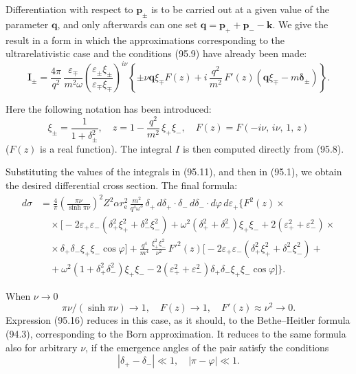 Differentiation with respect to $\mathbf{p}_\pm$ is to be carried out at a given value of the parameter $\mathbf{q}$, and only afterwards can one set $\mathbf{q} = \mathbf{p}_+ + \mathbf{p}_- - \mathbf{k}$. We give the result in a form in which the approximations corresponding to the ultrarelativistic case and the conditions (95.9) have already been made:
\begin{equation}
\mathbf{I}_\pm = \frac{4\pi}{q^2}\,\frac{\varepsilon_\mp}{m^2\omega}\!\left(\frac{\varepsilon_\pm\xi_\pm}{\varepsilon_\mp\xi_\mp}\right)^{\!i\nu}\!\left\{\pm\nu\mathbf{q}\xi_\mp F(z) + i\,\frac{q^2}{m^2}\,F'(z)(\mathbf{q}\xi_\mp - m\boldsymbol{\delta}_\pm)\right\}.
\label{eq:95.14}
\end{equation}


Here the following notation has been introduced:
\begin{equation}
\xi_\pm = \frac{1}{1 + \delta_\pm^2}, \quad z = 1 - \frac{q^2}{m^2}\,\xi_+\xi_-, \quad F(z) = F(-i\nu,\,i\nu,\,1,\,z)
\label{eq:95.15}
\end{equation}
($F(z)$ is a real function). The integral $I$ is then computed directly from (95.8).

Substituting the values of the integrals in (95.11), and then in (95.1), we obtain the desired differential cross section. The final formula:
\begin{equation}
\begin{split}
d\sigma &= \frac{4}{\pi}\left(\frac{\pi\nu}{\sinh\pi\nu}\right)^{\!2}Z^2\alpha r_\mathrm{e}^2\,\frac{m^2}{q^4\omega^3}\,\delta_+\,d\delta_+\cdot\delta_-\,d\delta_-\cdot d\varphi\,d\varepsilon_+\biggl\{F^2(z) \times {} \\
&\quad \times \bigl[-2\varepsilon_+\varepsilon_-(\delta_+^2\xi_+^2 + \delta_-^2\xi_-^2) + \omega^2(\delta_+^2 + \delta_-^2)\xi_+\xi_- + 2(\varepsilon_+^2 + \varepsilon_-^2) \times {} \\
&\quad \times \delta_+\delta_-\xi_+\xi_-\cos\varphi\bigr] + \frac{q^4}{m^4}\,\frac{\xi_+^2\xi_-^2}{\nu^2}\,F'^2(z)\bigl[-2\varepsilon_+\varepsilon_-(\delta_+^2\xi_+^2 + \delta_-^2\xi_-^2) + {} \\
&\quad {} + \omega^2(1 + \delta_+^2\delta_-^2)\xi_+\xi_- - 2(\varepsilon_+^2 + \varepsilon_-^2)\delta_+\delta_-\xi_+\xi_-\cos\varphi\bigr]\biggr\}.
\end{split}
\label{eq:95.16}
\end{equation}

When $\nu \to 0$
\[
\pi\nu/(\sinh\pi\nu) \to 1, \quad F(z) \to 1, \quad F'(z) \approx \nu^2 \to 0.
\]
Expression (95.16) reduces in this case, as it should, to the Bethe--Heitler formula (94.3), corresponding to the Born approximation. It reduces to the same formula also for arbitrary $\nu$, if the emergence angles of the pair satisfy the conditions
\[
|\delta_+ - \delta_-| \ll 1, \quad |\pi - \varphi| \ll 1.
\]

